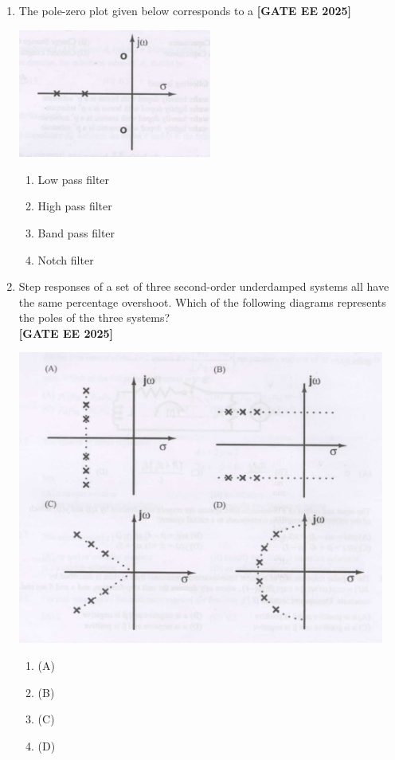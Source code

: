 \documentclass[12pt,a4paper]{article}
\begin{document}
\begin{enumerate}[leftmargin=2.5em, label=\textbf{Q.\arabic*}., itemsep=2em]
\item The pole-zero plot given below corresponds to a
\newline
\noindent \textbf{[GATE EE 2025]}
\begin{center}
\includegraphics[width=0.5\textwidth]{figs/q11.png}
\end{center}
\begin{enumerate}[label=(\Alph*)]
    \item Low pass filter
    \item High pass filter
    \item Band pass filter
    \item Notch filter
\end{enumerate}

\item Step responses of a set of three second-order underdamped systems all have the same percentage overshoot. Which of the following diagrams represents the poles of the three systems?\\
\newline
\noindent \textbf{[GATE EE 2025]}
\begin{center}
\includegraphics[width=0.95\textwidth]{figs/q12.png}
\end{center}
\begin{enumerate}[label=(\Alph*)]
  \item (A)
  \item (B)
  \item (C)
  \item (D)
\end{enumerate}


\end{enumerate}
\end{document}
